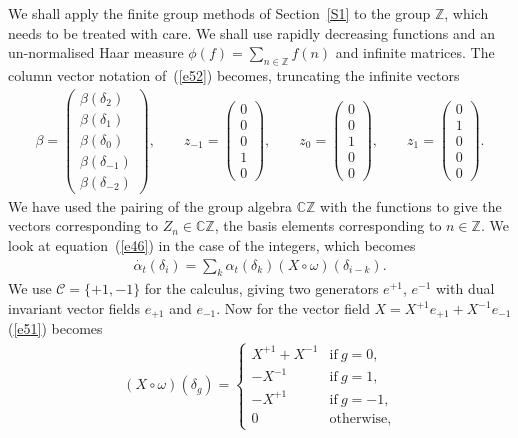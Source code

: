 \documentclass[10pt,a4paper]{amsart}
\numberwithin{equation}{section}
\newcommand{\C}{\mathbb{C}}
\newcommand{\Z}{\mathbb{Z}}
\newcommand{\<}{\langle}
\renewcommand{\>}{\rangle}
\begin{document}
We shall apply the finite group methods of Section~\ref{S1} to the group $ \Z $, which needs to be treated with care. We shall use rapidly decreasing functions and an un-normalised Haar measure $ \phi(f) =\sum_{n\in \Z} f(n)$ and infinite matrices. The column vector notation of~(\ref{e52}) becomes, truncating the infinite vectors
\begin{gather}\label{e69}
\beta= \left( \begin{matrix}
\beta(\delta_{2})\\
\beta(\delta_{1})\\
\beta(\delta_{0})\\
\beta(\delta_{-1})\\
\beta(\delta_{-2})
\end{matrix} \right), \qquad {z_{-1}}=\left( \begin{matrix}
0\\
0\\
0\\
1\\
0
\end{matrix}
\right),\qquad {z_0}=\left( \begin{matrix}
0\\
0\\
1\\
0\\
0
\end{matrix}
\right),\qquad {z_1}=\left( \begin{matrix}
0\\
1\\
0\\
0\\
0
\end{matrix}
\right).
\end{gather}
We have used the pairing of the group algebra $ \C \Z $ with the functions to give the vectors corresponding to $ Z_{n}\in \C \Z $, the basis elements corresponding to $ n\in \Z $.
We look at equation~(\ref{e46}) in the case of the integers, which becomes
\begin{align}\label{e63}
\dot{\alpha_t}(\delta_{i})=\sum_{k}\alpha_t (\delta_{k}) (X \circ \omega)(\delta_{i-k}).
\end{align}
We use $ \mathcal{C}=\{+1,-1\} $ for the calculus, giving two generators $ e^{+1}$, $e^{-1} $ with dual invariant vector fields $ e_{+1}$ and $ e_{-1} $. Now for the vector field $ X =X^{+1}e_{+1}+X^{-1}e_{-1}$ (\ref{e51}) becomes
\begin{gather*}
(X \circ \omega)(\delta_{g})=\begin{cases}
X^{+1} +X^{-1} & \mbox{if} \ g=0, \\
- X^{-1} & \mbox{if}\ g=1,\\
- X^{+1} & \mbox{if}\ g=-1,\\
0 & \mbox{otherwise},
\end{cases}
\end{gather*}
\end{document}
